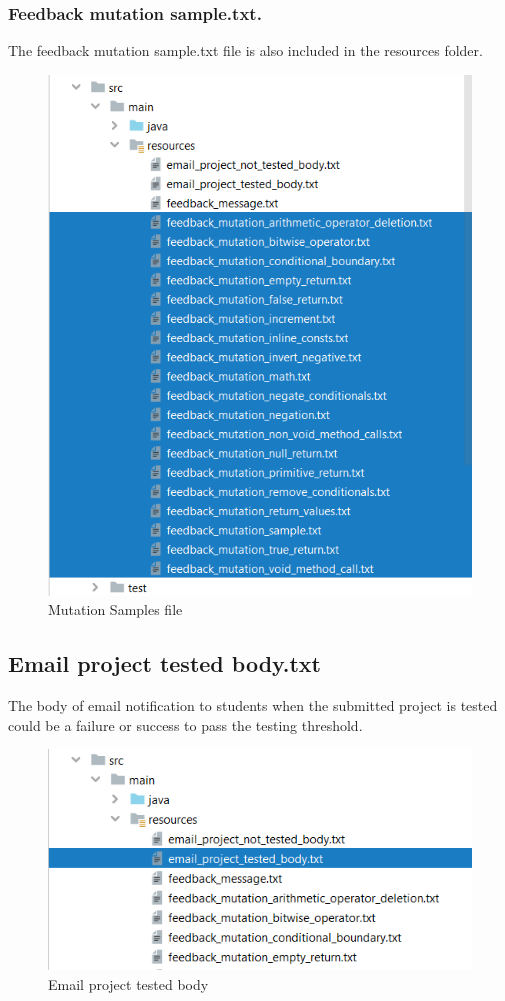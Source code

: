 \subsubsection{Feedback mutation sample.txt.}
The feedback mutation sample.txt file is also included in the resources folder.
\begin{figure}[h!]
	\centering
	\includegraphics[scale=1.3]{fig36.png}
	\caption{Mutation Samples file}
	\label{fig:f11}
\end{figure}
\newpage
\subsection{Email project tested body.txt}
The body of email notification to students when the submitted project is tested could be a failure or success to pass the testing threshold.
\begin{figure}[h!]
	\centering
	\includegraphics[scale=1.3]{fig37.png}
	\caption{Email project tested body}
	\label{fig:f11}
\end{figure}


